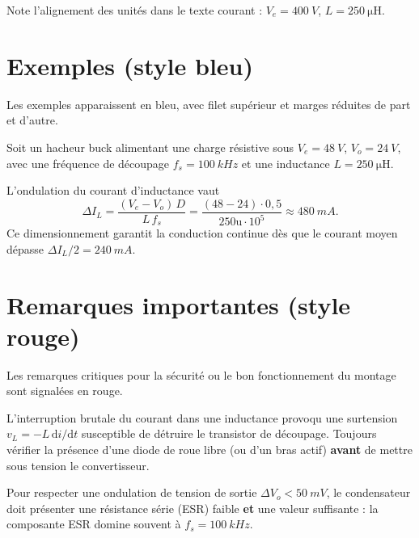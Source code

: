 Note l'alignement des unités dans le texte courant :
$V_e = \SI{400}{V}$, $L = \SI{250}{\micro\henry}$.

\section{Exemples (style bleu)}

Les exemples apparaissent en bleu, avec filet supérieur et marges
réduites de part et d'autre.

\begin{example}
  Soit un hacheur buck alimentant une charge résistive sous
  $V_e = \SI{48}{V}$, $V_o = \SI{24}{V}$, avec une fréquence de
  découpage $f_s = \SI{100}{kHz}$ et une inductance
  $L = \SI{250}{\micro\henry}$.

  L'ondulation du courant d'inductance vaut
  \begin{equation}
    \Delta I_L = \frac{(V_e - V_o)\,D}{L\,f_s}
               = \frac{(48 - 24)\cdot 0{,}5}{250\mathrm{u}\cdot 10^5}
               \approx \SI{480}{mA}.
  \end{equation}
  Ce dimensionnement garantit la conduction continue dès que le
  courant moyen dépasse $\Delta I_L / 2 = \SI{240}{mA}$.
\end{example}

\section{Remarques importantes (style rouge)}

Les remarques critiques pour la sécurité ou le bon fonctionnement du
montage sont signalées en rouge.

\begin{important}
  L'interruption brutale du courant dans une inductance provoqu une
  surtension $v_L = -L\,\mathrm{d}i/\mathrm{d}t$ susceptible de
  détruire le transistor de découpage. Toujours vérifier la présence
  d'une diode de roue libre (ou d'un bras actif) \textbf{avant} de
  mettre sous tension le convertisseur.
\end{important}

\begin{important}
  Pour respecter une ondulation de tension de sortie
  $\Delta V_o < \SI{50}{mV}$, le condensateur doit présenter une
  résistance série (ESR) faible \textbf{et} une valeur suffisante :
  la composante ESR domine souvent à $f_s = \SI{100}{kHz}$.
\end{important}

